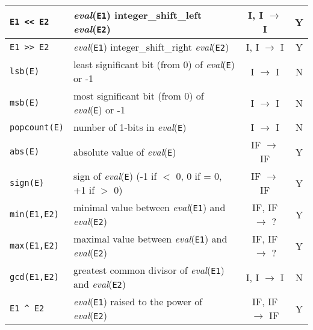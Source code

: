 \begin{supertabular}{|l|L{7.5cm}|c|c|}
\hline

\texttt{E1 << E2} & \textit{eval}(\texttt{E1}) integer\_shift\_left
\textit{eval}(\texttt{E2}) & I, I $\rightarrow$ I & Y \\

\hline

\texttt{E1 >> E2} & \textit{eval}(\texttt{E1}) integer\_shift\_right
\textit{eval}(\texttt{E2}) & I, I $\rightarrow$ I & Y \\

\hline

\texttt{lsb(E)} & least significant bit (from 0) of \textit{eval}(\texttt{E}) or -1 & I
$\rightarrow$ I & N \\

\hline

\texttt{msb(E)} & most significant bit (from 0) of \textit{eval}(\texttt{E}) or -1 & I
$\rightarrow$ I & N \\

\hline

\texttt{popcount(E)} & number of 1-bits in \textit{eval}(\texttt{E}) & I
$\rightarrow$ I & N \\

\hline

\texttt{abs(E)} & absolute value of \textit{eval}(\texttt{E}) & IF
$\rightarrow$ IF & Y \\

\hline

\texttt{sign(E)} & sign of \textit{eval}(\texttt{E}) (-1 if $<$ 0, 0 if = 0,
+1 if $>$ 0) & IF $\rightarrow$ IF & Y \\

\hline

\texttt{min(E1,E2)} & minimal value between \textit{eval}(\texttt{E1}) and
\textit{eval}(\texttt{E2}) & IF, IF $\rightarrow$ ? & Y \\

\hline

\texttt{max(E1,E2)} & maximal value between \textit{eval}(\texttt{E1}) and
\textit{eval}(\texttt{E2}) & IF, IF $\rightarrow$ ? & Y \\

\hline

\texttt{gcd(E1,E2)} & greatest common divisor of \textit{eval}(\texttt{E1}) and
\textit{eval}(\texttt{E2}) & I, I $\rightarrow$ I & N \\

\hline

\texttt{E1 \^{} E2}  & \textit{eval}(\texttt{E1}) raised to the power of
\textit{eval}(\texttt{E2}) & IF, IF $\rightarrow$ IF & Y \\


\end{supertabular}
